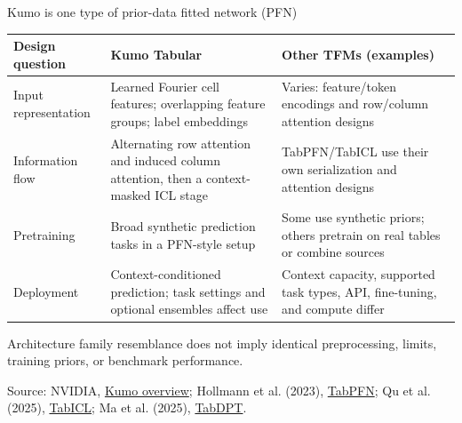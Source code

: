 \documentclass[11pt,aspectratio=169,hyperref={colorlinks}]{beamer}
\newcommand{\slidesource}[1]{\par\vfill\noindent\parbox{\linewidth}{\tiny\color{sourcegray}\raggedright\sloppy Source: #1.}}
\begin{document}
\begin{frame}{Kumo is one type of prior-data fitted network (PFN)}
\footnotesize
\begin{tabularx}{\linewidth}{@{}p{.25\linewidth}XX@{}}
\toprule
Design question & Kumo Tabular & Other TFMs (examples)\\\midrule
Input representation & Learned Fourier cell features; overlapping feature groups; label embeddings & Varies: feature/token encodings and row/column attention designs\\
Information flow & Alternating row attention and induced column attention, then a context-masked ICL stage & TabPFN/TabICL use their own serialization and attention designs\\
Pretraining & Broad synthetic prediction tasks in a PFN-style setup & Some use synthetic priors; others pretrain on real tables or combine sources\\
Deployment & Context-conditioned prediction; task settings and optional ensembles affect use & Context capacity, supported task types, API, fine-tuning, and compute differ\\
\bottomrule
\end{tabularx}
\par
\medskip
Architecture family resemblance does not imply identical preprocessing, limits, training priors, or benchmark performance.
\slidesource{NVIDIA, \href{https://huggingface.co/blog/nvidia/kumo-tabular}{Kumo overview}; Hollmann et al. (2023), \href{https://arxiv.org/abs/2207.01848}{TabPFN}; Qu et al. (2025), \href{https://proceedings.mlr.press/v267/qu25d.html}{TabICL}; Ma et al. (2025), \href{https://proceedings.neurips.cc/paper_files/paper/2025/file/fc0e3f908a2116ba529ad0a1530a3675-Paper-Conference.pdf}{TabDPT}}
\end{frame}
\end{document}
